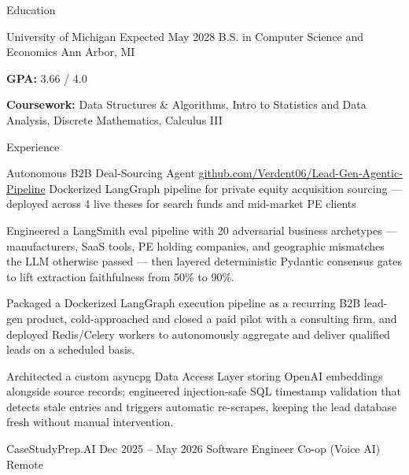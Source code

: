 \documentclass[
	11pt
]{../template}
\begin{document}
	\begin{rSection}{E}{ducation}
		\begin{rSectionEntry}
			{University of Michigan}
			{Expected May 2028}
			{B.S. in Computer Science and Economics}
			{}
			{Ann Arbor, MI}

			\item \textbf{GPA:} 3.66 / 4.0
			\item \textbf{Coursework:} Data Structures \& Algorithms, Intro to Statistics and Data Analysis, Discrete Mathematics, Calculus III
		\end{rSectionEntry}
	\end{rSection}

	\begin{rSection}{E}{xperience}
		\begin{rSectionEntry}
			{Autonomous B2B Deal-Sourcing Agent}
			{\href{https://github.com/Verdent06/Lead-Gen-Agentic-Pipeline}{github.com/Verdent06/Lead-Gen-Agentic-Pipeline}}
			{Dockerized LangGraph pipeline for private equity acquisition sourcing --- deployed across 4 live theses for search funds and mid-market PE clients}
			{}
			{}

			\item Engineered a LangSmith eval pipeline with 20 adversarial business archetypes --- manufacturers, SaaS tools, PE holding companies, and geographic mismatches the LLM otherwise passed --- then layered deterministic Pydantic consensus gates to lift extraction faithfulness from 50\% to 90\%.
			\item Packaged a Dockerized LangGraph execution pipeline as a recurring B2B lead-gen product, cold-approached and closed a paid pilot with a consulting firm, and deployed Redis/Celery workers to autonomously aggregate and deliver qualified leads on a scheduled basis.
			\item Architected a custom asyncpg Data Access Layer storing OpenAI embeddings alongside source records; engineered injection-safe SQL timestamp validation that detects stale entries and triggers automatic re-scrapes, keeping the lead database fresh without manual intervention.
		\end{rSectionEntry}

		\begin{rSectionEntry}
			{CaseStudyPrep.AI}
			{Dec 2025 -- May 2026}
			{Software Engineer Co-op (Voice AI)}
			{}
			{Remote}


\end{rSectionEntry}
\end{rSection}
\end{document}
